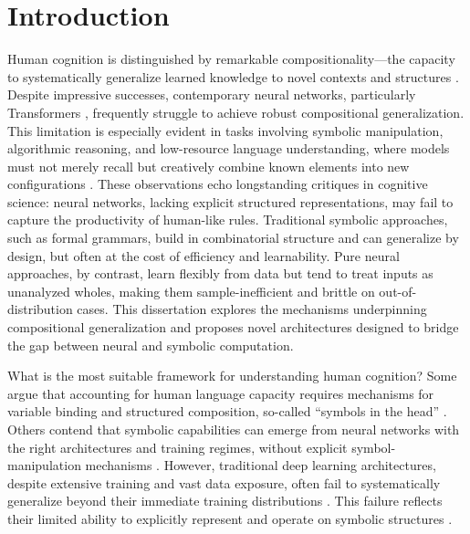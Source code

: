 \chapter{Introduction} \label{chap:chap-0}

Human cognition is distinguished by remarkable compositionality—the capacity to systematically generalize learned knowledge to novel contexts and structures \citep{fodor1988connectionism,lake2018generalization}. Despite impressive successes, contemporary neural networks, particularly Transformers \citep{vaswani2017attention}, frequently struggle to achieve robust compositional generalization. This limitation is especially evident in tasks involving symbolic manipulation, algorithmic reasoning, and low-resource language understanding, where models must not merely recall but creatively combine known elements into new configurations \citep{marcus2003algebraic, lake2018generalization}. These observations echo longstanding critiques in cognitive science: neural networks, lacking explicit structured representations, may fail to capture the productivity of human-like rules. Traditional symbolic approaches, such as formal grammars, build in combinatorial structure and can generalize by design, but often at the cost of efficiency and learnability. Pure neural approaches, by contrast, learn flexibly from data but tend to treat inputs as unanalyzed wholes, making them sample-inefficient and brittle on out-of-distribution cases. This dissertation explores the mechanisms underpinning compositional generalization and proposes novel architectures designed to bridge the gap between neural and symbolic computation.

What is the most suitable framework for understanding human cognition? Some argue that accounting for human language capacity requires mechanisms for variable binding and structured composition, so-called “symbols in the head” \citep{marcus2003algebraic, tenenbaum2011grow}. Others contend that symbolic capabilities can emerge from neural networks with the right architectures and training regimes, without explicit symbol-manipulation mechanisms \citep{elman_finding_1990, rumelhart1986c}. However, traditional deep learning architectures, despite extensive training and vast data exposure, often fail to systematically generalize beyond their immediate training distributions \citep{kim-linzen-2020-cogs, hupkes2020compositionality, kim_uncontrolled_2022}. This failure reflects their limited ability to explicitly represent and operate on symbolic structures \citep{Smolensky1990TensorPV}.

